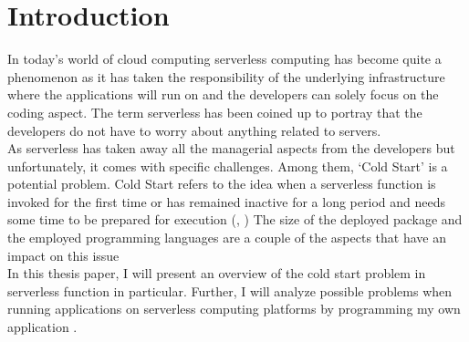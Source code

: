 %
\section{Introduction}\label{sec:introduction}
%
In today's world of cloud computing serverless computing has become quite a phenomenon as it has taken the responsibility of the underlying infrastructure where the applications will run on and the developers can solely focus on the coding aspect. The term serverless has been coined up to portray that the developers do not have to worry about anything related to servers.\\

As serverless has taken away all the managerial aspects from the developers but unfortunately, it comes with specific challenges. Among them, ‘Cold Start’ is a potential problem. Cold Start refers to the idea when a serverless function is invoked for the first time or has remained inactive for a long period and needs some time to be prepared for execution (\cite{MSD+19}, \cite{SA20}) The size of the deployed package and the employed programming languages are a couple of the aspects that have an impact on this issue \cite{MEHW18}\\

In this thesis paper, I will present an overview of the cold start problem in serverless function
 in particular. Further, I will analyze possible problems when running applications on serverless computing platforms by programming my own application \cite{CIM+19}.\\
